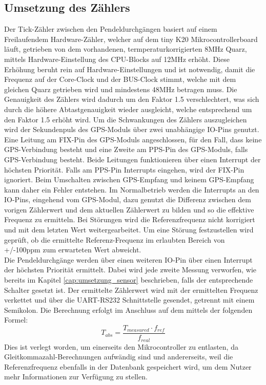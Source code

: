 \subsection{Umsetzung des Zählers}
\label{cap:counter_realisation}
Der Tick-Zähler zwischen den Pendeldurchgängen basiert auf einem Freilaufendem Hardware-Zähler, welcher auf dem tiny K20 Mikrocontrollerboard läuft, getrieben von dem vorhandenen, termperaturkorrigierten 8MHz Quarz, mittels Hardware-Einstellung des CPU-Blocks auf 12MHz erhöht. Diese Erhöhung beruht rein auf Hardware-Einstellungen und ist notwendig, damit die Frequenz auf der Core-Clock und der BUS-Clock stimmt, welche mit dem gleichen Quarz getrieben wird und mindestens 48MHz betragen muss. Die Genauigkeit des Zählers wird dadurch um den Faktor 1.5 verschlechtert, was sich durch die höhere Abtastgenauigkeit wieder ausgleicht, welche entsprechend um den Faktor 1.5 erhöht wird.
Um die Schwankungen des Zählers auszugleichen wird der Sekundenpuls des GPS-Moduls über zwei unabhängige IO-Pins genutzt. Eine Leitung am FIX-Pin des GPS-Moduls angeschlossen, für den Fall, dass keine GPS-Verbindung besteht und eine Zweite am PPS-Pin des GPS-Moduls, falls GPS-Verbindung besteht.
Beide Leitungen funktionieren über einen Interrupt der höchsten Priorität. Falls am PPS-Pin Interrupts eingehen, wird der FIX-Pin ignoriert. Beim Umschalten zwischen GPS-Empfang und keinem GPS-Empfang kann daher ein Fehler entstehen. Im Normalbetrieb werden die Interrupts an den IO-Pins, eingehend vom GPS-Modul, dazu genutzt die Differenz zwischen dem vorigen Zählerwert und dem aktuellen Zählerwert zu bilden und so die effektive Frequenz zu ermitteln. Bei Störungen wird die Referenzfrequenz nicht korrigiert und mit dem letzten Wert weitergearbeitet. Um eine Störung festzustellen wird geprüft, ob die ermittelte Referenz-Frequenz im erlaubten Bereich von +/-100ppm zum erwarteten Wert abweicht.\\ 
Die Pendeldurchgänge werden über einen weiteren IO-Pin über einen Interrupt der höchsten Priorität ermittelt. Dabei wird jede zweite Messung verworfen, wie bereits im Kapitel \ref{cap:umsetzung_sensor} beschrieben, falls der entsprechende Schalter gesetzt ist. Der ermittelte Zählerwert wird mit der ermittelten Frequenz verkettet und über die UART-RS232 Schnittstelle gesendet, getrennt mit einem Semikolon. Die Berechnung erfolgt im Anschluss auf dem \rpi mittels der folgenden Formel:
\[
	T_{abs} = \frac{T_{measured} \cdot f_{ref}}{f_{real}}
\]
Dies ist verlegt worden, um einerseits den Mikrocontroller zu entlasten, da Gleitkommazahl-Berechnungen aufwändig sind und andererseits, weil die Referenzfrequenz ebenfalls in der Datenbank gespeichert wird, um dem Nutzer mehr Informationen zur Verfügung zu stellen.
